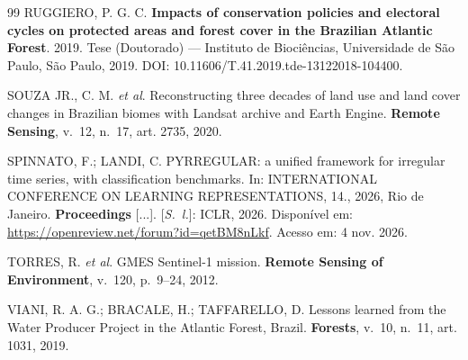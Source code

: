 \documentclass[conference]{IEEEtran}
\begin{document}
\begin{thebibliography}{99}
 RUGGIERO, P. G. C. \textbf{Impacts of conservation policies and electoral cycles on protected areas and forest cover in the Brazilian Atlantic Forest}. 2019. Tese (Doutorado) --- Instituto de Biociências, Universidade de São Paulo, São Paulo, 2019. DOI: 10.11606/T.41.2019.tde-13122018-104400.




 SOUZA JR., C. M. \textit{et al}. Reconstructing three decades of land use and land cover changes in Brazilian biomes with Landsat archive and Earth Engine. \textbf{Remote Sensing}, v.~12, n.~17, art. 2735, 2020.

 SPINNATO, F.; LANDI, C. PYRREGULAR: a unified framework for irregular time series, with classification benchmarks. In: INTERNATIONAL CONFERENCE ON LEARNING REPRESENTATIONS, 14., 2026, Rio de Janeiro. \textbf{Proceedings} [...]. [\textit{S.~l.}]: ICLR, 2026. Disponível em: \url{https://openreview.net/forum?id=qetBM8nLkf}. Acesso em: 4 nov. 2026.

 TORRES, R. \textit{et al}. GMES Sentinel-1 mission. \textbf{Remote Sensing of Environment}, v.~120, p.~9--24, 2012.


 VIANI, R. A. G.; BRACALE, H.; TAFFARELLO, D. Lessons learned from the Water Producer Project in the Atlantic Forest, Brazil. \textbf{Forests}, v.~10, n.~11, art. 1031, 2019.


\end{thebibliography}
\end{document}

